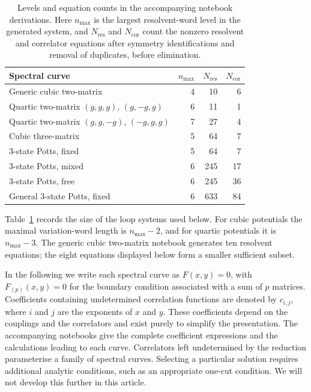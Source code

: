 \begin{table}[htbp]
    \centering
    \begin{tabular}{@{}lrrr@{}}
        \toprule
        Spectral curve                           & $n_{\mathrm{max}}$ & $N_{\mathrm{res}}$ & $N_{\mathrm{cor}}$ \\
        \midrule
        Generic cubic two-matrix                 & 4                  & 10                 & 6 \\
        Quartic two-matrix $(g,g,g)$, $(g,-g,g)$ & 6                  & 11                 & 1 \\
        Quartic two-matrix $(g,g,-g)$, $(-g,g,g)$ & 7                  & 27                 & 4 \\
        Cubic three-matrix                       & 5                  & 64                 & 7 \\
        3-state Potts, fixed                     & 5                  & 64                 & 7 \\
        3-state Potts, mixed                     & 6                  & 245                & 17 \\
        3-state Potts, free                      & 6                  & 245                & 36 \\
        General 3-state Potts, fixed             & 6                  & 633                & 84 \\
        \bottomrule
    \end{tabular}
    \caption{Levels and equation counts in the accompanying notebook derivations.
        Here $n_{\mathrm{max}}$ is the largest resolvent-word level in the generated
        system, and $N_{\mathrm{res}}$ and $N_{\mathrm{cor}}$ count the nonzero
        resolvent and correlator equations after symmetry identifications
        and removal of duplicates, before elimination.}
    \label{tab:curve-counts}
\end{table}

Table~\ref{tab:curve-counts} records the size of the loop systems used below. For cubic potentials
the maximal variation-word length is $n_{\mathrm{max}}-2$, and for quartic potentials it is
$n_{\mathrm{max}}-3$. The generic cubic two-matrix notebook generates ten resolvent equations; the
eight equations displayed below form a smaller sufficient subset.

In the following we write each spectral curve as $F(x,y)=0$, with $F_{(p)}(x,y)=0$ for the boundary condition
associated with a sum of $p$ matrices. Coefficients containing undetermined correlation functions
are denoted by $c_{i,j}$, where $i$ and $j$ are the exponents of $x$ and $y$. These coefficients
depend on the couplings and the correlators and exist purely
to simplify the presentation. The accompanying notebooks \cite{Kulanthaivelu:LoopEquationsCode} give the complete coefficient expressions and the calculations leading to each curve. Correlators left undetermined by the reduction parameterise a family of spectral curves. Selecting a particular solution requires additional analytic conditions, such as an appropriate one-cut condition. We will not develop this further in this article.
